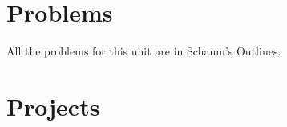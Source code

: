 

\section{Problems}

All the problems for this unit are in Schaum's Outlines.

%
%
%
%

























\section{Projects}


